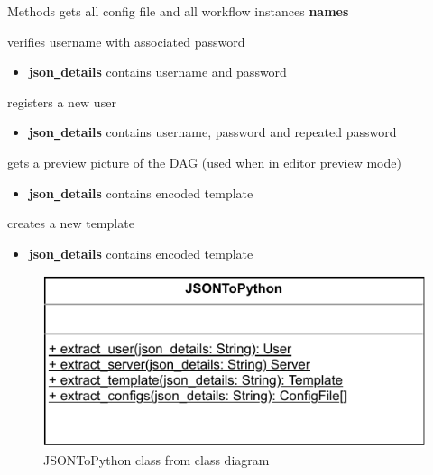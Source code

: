 \begin{methodenv}{Methods}
gets all  config file and all workflow instances \textbf{names} 

verifies username with associated password
\begin{itemize}
        \item \textbf{json\texttt{\_}details}
        contains username and password
\end{itemize}

registers a new user
\begin{itemize}
        \item \textbf{json\texttt{\_}details}
        contains username, password and repeated password
\end{itemize}

gets a preview picture of the DAG (used when in editor preview mode)
\begin{itemize}
        \item \textbf{json\texttt{\_}details}
        contains encoded template
\end{itemize}

creates a new template
\begin{itemize}
        \item \textbf{json\texttt{\_}details}
        contains encoded template
\end{itemize}

\end{methodenv}


\begin{figure}[h]
        \centerline{\includegraphics[scale=1]{res/Klassen/JSONToPython.pdf}}
        \caption{JSONToPython class from class diagram}
\end{figure}

